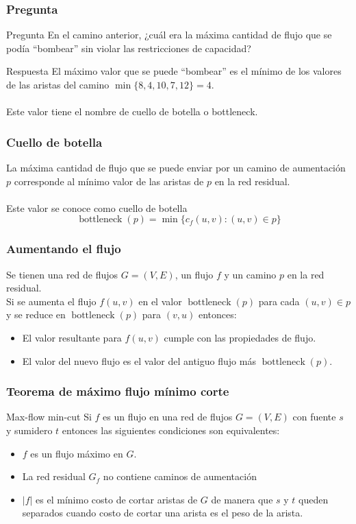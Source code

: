 \documentclass{beamer}
\begin{document}
	\begin{frame}
		\frametitle{Pregunta}
		\begin{alertblock}{Pregunta}
			En el camino anterior, ¿cuál era la máxima cantidad de flujo que se podía ``bombear'' sin violar las restricciones de capacidad?
		\end{alertblock}
		\pause
		\begin{exampleblock}{Respuesta}
			El máximo valor que se puede ``bombear'' es el mínimo de los valores de las aristas del camino $\operatorname{min}\{8, 4, 10, 7, 12\} = 4$.\\ \quad \\
			Este valor tiene el nombre de cuello de botella o bottleneck.
		\end{exampleblock}
	\end{frame}

	\begin{frame}
		\frametitle{Cuello de botella}
		La máxima cantidad de flujo que se puede enviar por un camino de aumentación $p$ corresponde al mínimo valor de las aristas de $p$ en la red residual.\\ \quad \\
		Este valor se conoce como cuello de botella $$\operatorname{bottleneck}(p) = \operatorname{min}\{c_f(u,v) : (u,v) \in p\}$$
	\end{frame}

	\begin{frame}
		\frametitle{Aumentando el flujo}
		Se tienen una red de flujos $G = (V, E)$, un flujo $f$ y un camino $p$ en la red residual.\\
	
		Si se aumenta el flujo $f(u,v)$ en el valor $\operatorname{bottleneck}(p)$ para cada $(u,v) \in p$ y se reduce en $\operatorname{bottleneck}(p)$ para $(v,u)$ entonces:
		\begin{itemize}
			\item El valor resultante para $f(u,v)$ cumple con las propiedades de flujo.
			\item El valor del nuevo flujo es el valor del antiguo flujo más $\operatorname{bottleneck}(p)$.
		\end{itemize}
	\end{frame}
	
	
	
	\begin{frame}
		\frametitle{Teorema de máximo flujo mínimo corte}
		\begin{block}{Max-flow min-cut}
			Si $f$ es un flujo en una red de flujos $G = (V, E)$ con fuente $s$ y sumidero $t$ entonces las siguientes condiciones son equivalentes:
			\begin{itemize}
				\item $f$ es un flujo máximo en $G$.
				\item La red residual $G_f$ no contiene caminos de aumentación
				\item $|f|$ es el mínimo costo de cortar aristas de $G$ de manera que $s$ y $t$ queden separados cuando costo de cortar una arista es el peso de la arista.
			\end{itemize}
		\end{block}
	\end{frame}
\end{document}
